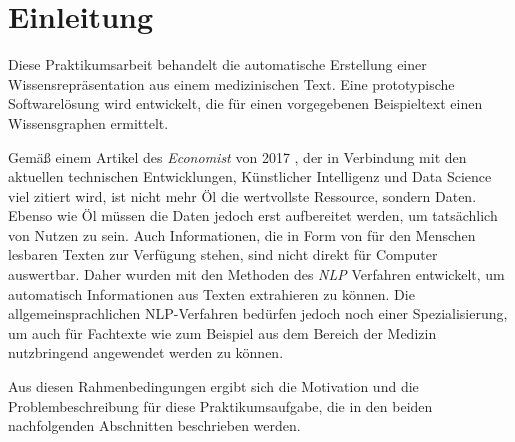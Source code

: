 \renewcommand{\chaptermark}[1]{\markboth{\spacedlowsmallcaps{#1}}{\spacedlowsmallcaps{#1}}}
\renewcommand{\sectionmark}[1]{\markright{\thesection\enspace\spacedlowsmallcaps{#1}}}
\setcounter{secnumdepth}{2} 

\chapter{Einleitung}

Diese Praktikumsarbeit behandelt die automatische Erstellung einer Wissensrepräsentation aus einem medizinischen Text. Eine prototypische Softwarelösung wird entwickelt, die für einen vorgegebenen Beispieltext einen Wissensgraphen ermittelt.

Gemäß einem Artikel des \emph{Economist} von 2017 \cite{the_economist_worlds_2017}, der in Verbindung mit den aktuellen technischen Entwicklungen, Künstlicher Intelligenz und Data Science viel zitiert wird, ist nicht mehr Öl die wertvollste Ressource, sondern Daten. Ebenso wie Öl müssen die Daten jedoch erst aufbereitet werden, um tatsächlich von Nutzen zu sein. Auch Informationen, die in Form von für den Menschen lesbaren Texten zur Verfügung stehen, sind nicht direkt für Computer auswertbar. Daher wurden mit den Methoden des \emph{\ac{NLP}} Verfahren entwickelt, um automatisch Informationen aus Texten extrahieren zu können. Die allgemeinsprachlichen NLP-Verfahren bedürfen jedoch noch einer Spezialisierung, um auch für Fachtexte wie zum Beispiel aus dem Bereich der Medizin nutzbringend angewendet werden zu können.

Aus diesen Rahmenbedingungen ergibt sich die Motivation und die Problembeschreibung für diese Praktikumsaufgabe, die in den beiden nachfolgenden Abschnitten beschrieben werden.